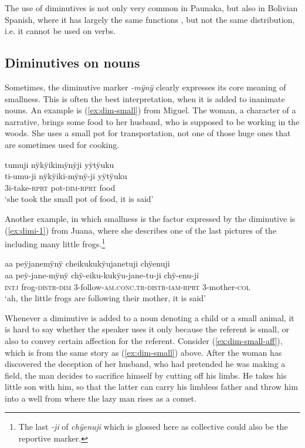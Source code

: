 The use of diminutives is not only very common in Paunaka, but also in Bolivian Spanish, where it has largely the same functions \citep[cf.][38]{Mendoza2015}, but not the same distribution, i.e. it cannot be used on verbs.


\subsection{Diminutives on nouns}\label{sec:Diminuitves_Nouns}
\largerpage
Sometimes, the diminutive marker \textit{-mÿnÿ} clearly expresses its core meaning of smallness. This is often the best interpretation, when it is added to inanimate nouns. An example is (\ref{ex:dim-small}) from Miguel. The woman, a character of a narrative, brings some food to her husband, who is supposed to be working in the woods. She uses a small pot for transportation, not one of those huge ones that are sometimes used for cooking. 

\ea\label{ex:dim-small}
\begingl 
\glpreamble tumuji nÿkÿikimÿnÿji yÿtÿuku\\
\gla ti-umu-ji nÿkÿiki-mÿnÿ-ji yÿtÿuku\\ 
\glb 3i-take-\textsc{rprt} pot-\textsc{dim}-\textsc{rprt} food\\ 
\glft ‘she took the small pot of food, it is said’
\trailingcitation{[mox-n110920l.058-059]}
\xe

Another example, in which smallness is the factor expressed by the diminutive is (\ref{ex:dimi-1}) from Juana, where she describes one of the last pictures of the  including many little frogs.\footnote{The last \textit{-ji} of \textit{chÿenuji} which is glossed here as collective could also be the reportive marker.}

\ea\label{ex:dimi-1}
\begingl
\glpreamble aa peÿjanemÿnÿ cheikukukÿujanetuji chÿenuji\\
\gla aa peÿ-jane-mÿnÿ chÿ-eiku-kukÿu-jane-tu-ji chÿ-enu-ji\\
\glb \textsc{intj} frog-\textsc{distr}-\textsc{dim} 3-follow-\textsc{am.conc.tr}-\textsc{distr}-\textsc{iam}-\textsc{rprt} 3-mother-\textsc{col} \\
\glft ‘ah, the little frogs are following their mother, it is said’
\endgl
\trailingcitation{[jxx-a120516l-a.440]}
\xe

Whenever a diminutive is added to a noun denoting a child or a small animal, it is hard to say whether the speaker uses it only because the referent is small, or also to convey certain affection for the referent.  Consider (\ref{ex:dim-small-aff}), which is from the same story as (\ref{ex:dim-small}) above. After the woman has discovered the deception of her husband, who had pretended he was making a field, the man decides to sacrifice himself by cutting off his limbs. He takes his little son with him, so that the latter can carry his limbless father and throw him into a well from where the lazy man rises as a comet.

